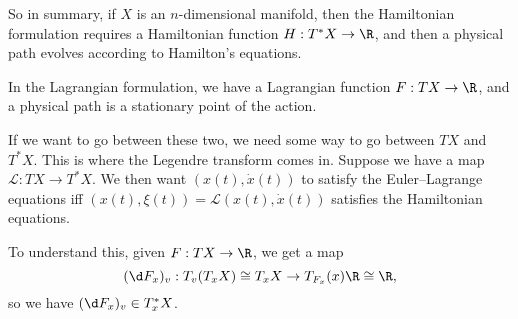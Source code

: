 \documentclass[a4paper]{article}
\begin{document}
So in summary, if $X$ is an $n$-dimensional manifold, then the Hamiltonian formulation requires a Hamiltonian function $H: T^* X \to \R$, and then a physical path evolves according to Hamilton's equations.

In the Lagrangian formulation, we have a Lagrangian function $F: TX \to \R$, and a physical path is a stationary point of the action.

If we want to go between these two, we need some way to go between $TX$ and $T^*X$. This is where the Legendre transform comes in. Suppose we have a map $\mathcal{L}: TX \to T^*X$. We then want $(x(t), \dot{x}(t))$ to satisfy the Euler--Lagrange equations iff $(x(t), \xi(t)) = \mathcal{L}(x(t), \dot{x}(t))$ satisfies the Hamiltonian equations. 

To understand this, given $F: TX \to \R$, we get a map
\[
  (\d F_x)_v : T_v(T_x X) \cong T_x X \to T_{F_x}(x) \R \cong \R,
\]
so we have $(\d F_x)_v \in T_x^*X$.
\end{document}
